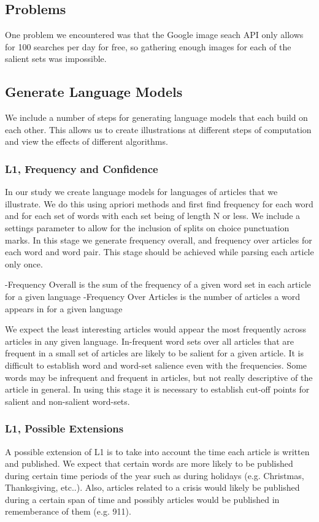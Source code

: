 \documentclass[12pt]{article}
\begin{document}
\subsection{Problems}
One problem we encountered was that the Google image seach API only allows for 100 searches per day for free, so gathering enough images for each of the salient sets was impossible.
\subsection{Generate Language Models}
We include a number of steps for generating language models that each build on each other. This allows us to create illustrations at different steps of computation and view the effects of different algorithms.
\subsubsection{L1, Frequency and Confidence}
In our study we create language models for languages of articles that we illustrate. We do this using apriori methods and first find frequency for each word and for each set of words with each set being of length N or less. We include a settings parameter to allow for the inclusion of splits on choice punctuation marks. In this stage we generate frequency overall, and frequency over articles for each word and word pair. This stage should be achieved while parsing each article only once.

-Frequency Overall is the sum of the frequency of a given word set in each article for a given language
-Frequency Over Articles is the number of articles a word appears in for a given language

We expect the least interesting articles would appear the most frequently across articles in any given language. In-frequent word sets over all articles that are frequent in a small set of articles are likely to be salient for a given article. It is difficult to establish word and word-set salience even with the frequencies. Some words may be infrequent and frequent in articles, but not really descriptive of the article in general. In using this stage it is necessary to establish
cut-off points for salient and non-salient word-sets.

\subsubsection{L1, Possible Extensions}
A possible extension of L1 is to take into account the time each article is written and published. We expect that certain words are more likely to be published during certain time periods of the year such as during holidays (e.g. Christmas, Thanksgiving, etc..). Also, articles related to a crisis would likely be published during a certain span of time and possibly articles would be published in rememberance of them (e.g. 911).
\end{document}
